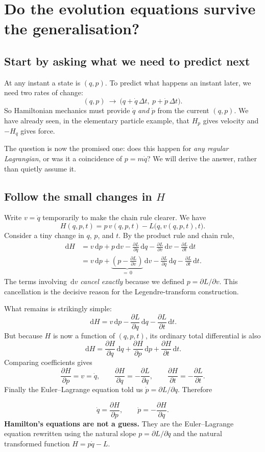 \documentclass[11pt,a4paper,oneside]{article}
\newcommand{\dd}{\,\mathrm d}
\newcommand{\pd}[2]{\frac{\partial #1}{\partial #2}}
\begin{document}
\section{Do the evolution equations survive the generalisation?}
\subsection{Start by asking what we need to predict next}
At any instant a state is $(q,p)$. To predict what happens an instant later, we need two rates of change:
\[
 (q,p)\ \longrightarrow\ \bigl(q+\dot q\,\Delta t,\ p+\dot p\,\Delta t\bigr).
\]
So Hamiltonian mechanics must provide $\dot q$ \emph{and} $\dot p$ from the current $(q,p)$. We have already seen, in the elementary particle example, that $H_p$ gives velocity and $-H_q$ gives force.

The question is now the promised one: does this happen for \emph{any regular Lagrangian}, or was it a coincidence of $p=m\dot q$? We will derive the answer, rather than quietly assume it.

\subsection{Follow the small changes in $H$}
Write $v=\dot q$ temporarily to make the chain rule clearer. We have
\[
 H(q,p,t)=p\,v(q,p,t)-L\bigl(q,v(q,p,t),t\bigr).
\]
Consider a tiny change in $q$, $p$, and $t$. By the product rule and chain rule,
\begin{align*}
 \dd H
  &=v\dd p+p\dd v
       -\pd{L}{q}\dd q-\pd{L}{v}\dd v-\pd{L}{t}\dd t\\
  &=v\dd p+\underbrace{\left(p-\pd{L}{v}\right)}_{=\,0}\dd v
       -\pd{L}{q}\dd q-\pd{L}{t}\dd t.
\end{align*}
The terms involving $\dd v$ \emph{cancel exactly} because we defined $p=\partial L/\partial v$. This cancellation is the decisive reason for the Legendre-transform construction.

What remains is strikingly simple:
\begin{equation}\label{eq:dh}
 \boxed{\dd H=v\dd p-\pd{L}{q}\dd q-\pd{L}{t}\dd t.}
\end{equation}
But because $H$ is now a function of $(q,p,t)$, its ordinary total differential is also
\[
 \dd H=\pd{H}{q}\dd q+\pd{H}{p}\dd p+\pd{H}{t}\dd t.
\]
Comparing coefficients gives
\[
 \pd{H}{p}=v=\dot q,\qquad
 \pd{H}{q}=-\pd{L}{q},\qquad
 \pd{H}{t}=-\pd{L}{t}.
\]
Finally the Euler--Lagrange equation told us $\dot p=\partial L/\partial q$. Therefore
\begin{keybox}
\begin{equation}\label{eq:hamilton}
 \boxed{\dot q=\pd{H}{p},\qquad\dot p=-\pd{H}{q}.}
\end{equation}
\textbf{Hamilton's equations are not a guess.} They are the Euler--Lagrange equation rewritten using the natural slope $p=\partial L/\partial\dot q$ and the natural transformed function $H=p\dot q-L$.
\end{keybox}
\end{document}
